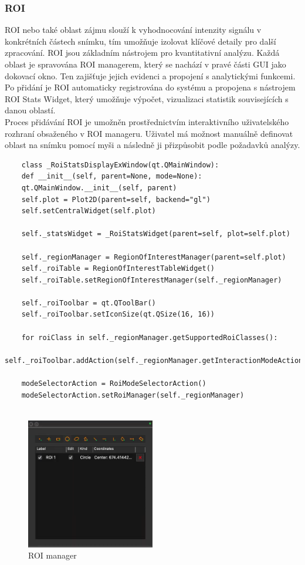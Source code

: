 \documentclass[a4paper,11pt]{article}
\begin{document}
\subsubsection{ROI}
ROI nebo také oblast zájmu slouží k vyhodnocování intenzity signálu v konkrétních částech snímku, tím umožňuje izolovat klíčové detaily pro další zpracování. ROI jsou základním nástrojem pro kvantitativní analýzu. Každá oblast je spravována ROI managerem, který se nachází v pravé části GUI jako dokovací okno. Ten zajišťuje jejich evidenci a propojení s analytickými funkcemi. Po přidání je ROI automaticky registrována do systému a propojena s nástrojem ROI Stats Widget, který umožňuje výpočet, vizualizaci statistik souvisejících s danou oblastí.\\

Proces přidávání ROI je umožněn prostřednictvím interaktivního uživatelského rozhraní obsaženého v ROI manageru. Uživatel má možnost manuálně definovat oblast na snímku pomocí myši a následně ji přizpůsobit podle požadavků analýzy.\\
\newpage

\begin{lstlisting}
	class _RoiStatsDisplayExWindow(qt.QMainWindow):
	def __init__(self, parent=None, mode=None):
	qt.QMainWindow.__init__(self, parent)
	self.plot = Plot2D(parent=self, backend="gl")
	self.setCentralWidget(self.plot)
	
	self._statsWidget = _RoiStatsWidget(parent=self, plot=self.plot)
	
	self._regionManager = RegionOfInterestManager(parent=self.plot)
	self._roiTable = RegionOfInterestTableWidget()
	self._roiTable.setRegionOfInterestManager(self._regionManager)
	
	self._roiToolbar = qt.QToolBar()
	self._roiToolbar.setIconSize(qt.QSize(16, 16))
	
	for roiClass in self._regionManager.getSupportedRoiClasses():
	self._roiToolbar.addAction(self._regionManager.getInteractionModeAction(roiClass))
	
	modeSelectorAction = RoiModeSelectorAction()
	modeSelectorAction.setRoiManager(self._regionManager)
	
\end{lstlisting}

\begin{figure}[H]
	\centering
	\includegraphics[width=0.5\textwidth]{images/ROIManager.png}
	\caption{ROI manager}
\end{figure}
\end{document}

